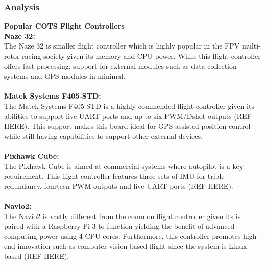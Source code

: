 \subsubsection{Analysis}
\textbf{Popular COTS Flight Controllers}\\

\textbf{Naze 32:}\\
The Naze 32 is smaller flight controller which is highly popular in the FPV multi-rotor racing society given its memory and CPU power. While this flight controller offers fast processing, support for external modules such as data collection systems and GPS modules in minimal.\\
\\
\textbf{Matek Systems F405-STD:}\\
The Matek Systems F405-STD is a highly commended flight controller given its abilities to support five UART ports and up to six PWM/Dshot outputs (REF HERE). This support makes this board ideal for GPS assisted position control while still having capabilities to support other external devices. \\
\\
\textbf{Pixhawk Cube:}\\
The Pixhawk Cube is aimed at commercial systems where autopilot is a key requirement. This flight controller features three sets of IMU for triple redundancy, fourteen PWM outputs and five UART ports (REF HERE).\\
\\
\textbf{Navio2:}\\
The Navio2 is vastly different from the common flight controller given its is paired with a Raspberry Pi 3 to function yielding the benefit of advanced computing power using 4 CPU cores. Furthermore, this controller promotes high end innovation such as computer vision based flight since the system is Linux based (REF HERE).\\
\clearpage

